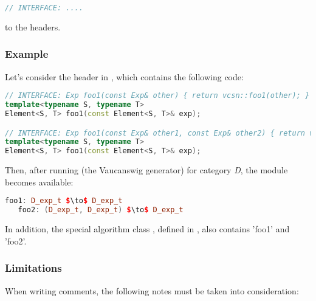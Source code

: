 \begin{lstlisting}[language=C++]
// INTERFACE: ....
\end{lstlisting}

to the \Vauc headers.


\subsubsection{Example}

Let's consider the \Vauc header  in
, which contains the following
code:

\begin{lstlisting}[language=C++]
// INTERFACE: Exp foo1(const Exp& other) { return vcsn::foo1(other); }
template<typename S, typename T>
Element<S, T> foo1(const Element<S, T>& exp);

// INTERFACE: Exp foo1(const Exp& other1, const Exp& other2) { return vcsn::foo2(other1, other2); }
template<typename S, typename T>
Element<S, T> foo1(const Element<S, T>& exp);
\end{lstlisting}

Then,  after  running    (the Vaucanswig  generator)  for
category \emph{D}, the module  becomes available:

\begin{lstlisting}[language=C++]
   foo1: D_exp_t $\to$ D_exp_t
   foo2: (D_exp_t, D_exp_t) $\to$ D_exp_t
\end{lstlisting}

In   addition,  the   special  algorithm   class  ,   defined  in
, also contains 'foo1' and 'foo2'.

\subsubsection{Limitations}

When writing   comments, the following  notes must be
taken into consideration:

